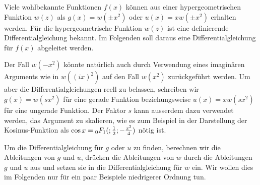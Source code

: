 Viele wohlbekannte Funktionen $f(x)$ können aus einer hypergeometrischen
Funktion $w(z)$ als $g(x)=w(\pm x^2)$ oder $u(x)=xw(\pm x^2)$ erhalten
werden.
Für die hypergeometrische Funktion $w(z)$ ist eine definierende
Differentialgleichung bekannt.
Im Folgenden soll daraus eine Differentialgleichung für $f(x)$
abgeleitet werden.

Der Fall $w(-x^2)$ könnte natürlich auch durch Verwendung eines
imaginären Arguments wie in $w((ix)^2)$ auf den Fall $w(x^2)$ 
zurückgeführt werden.
Um aber die Differentialgleichungen reell zu belassen, schreiben
wir $g(x)=w(sx^2)$ für eine gerade Funktion beziehungsweise
$u(x)=xw(sx^2)$ für eine ungerade Funktion.
Der Faktor $s$ kann ausserdem dazu verwendet werden, das Argument
zu skalieren, wie es zum Beispiel in der Darstellung der
Kosinus-Funktion als $\cos x = \mathstrut_0F_1(;\frac12;-\frac{x^2}4)$
nötig ist.

Um die Differentialgleichung für $g$ oder $u$ zu finden, berechnen wir die
Ableitungen von $g$ und $u$, drücken die Ableitungen von $w$ durch die
Ableitungen $g$ und $u$ aus und setzen sie in die Differentialgleichung
für $w$ ein.
Wir wollen dies im Folgenden nur für ein paar Beispiele niedrigerer
Ordnung tun.

%
%
